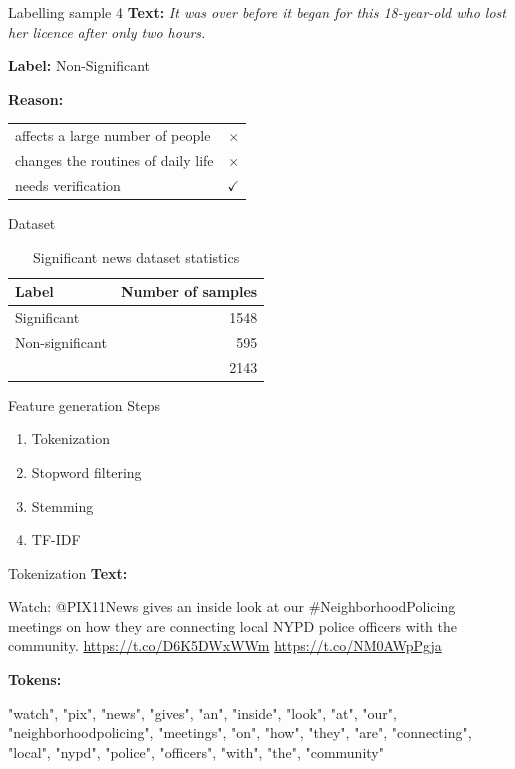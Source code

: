 \documentclass[12pt]{beamer}
\begin{document}
\begin{frame}{Labelling sample 4}
\textbf{Text:}
\textit{It was over before it began for this 18-year-old who lost her licence after only two hours.}\par
\textbf{Label:} Non-Significant\par
\textbf{Reason:}
\begin{table}
    \begin{tabular}{l | r}
        \toprule
        affects a large number of people & $\times$ \\
        changes the routines of daily life & $\times$ \\
        needs verification & $\checkmark$ \\
        \bottomrule
    \end{tabular}
\end{table}
\end{frame}

\begin{frame}{Dataset}
    \begin{table}[h]
    \begin{center}
    \begin{tabular}{lr}
    \toprule 
    Label&Number of samples\\
    \midrule 
    Significant&1548\\
    Non-significant&595\\
    \bottomrule
    &2143 \\
    \end{tabular}
    \caption{Significant news dataset statistics}
    \label{tbl:dataset_statistics}
    \end{center}
    \end{table}
\end{frame}

\begin{frame}{Feature generation}
    Steps
    \begin{enumerate}
        \item Tokenization
        \item Stopword filtering
        \item Stemming
        \item TF-IDF
    \end{enumerate}
\end{frame}

\begin{frame}{Tokenization}
    \textbf{Text:} \par
    Watch: @PIX11News  gives an inside look at our \#NeighborhoodPolicing
    meetings on how they are connecting local NYPD police officers with
    the community. \url{https://t.co/D6K5DWxWWm} \url{https://t.co/NM0AWpPgja}

    \textbf{Tokens:} \par
    "watch", "pix", "news", "gives", "an", "inside", "look", "at", "our", "neighborhoodpolicing", "meetings", "on", "how", "they", "are", "connecting", "local", "nypd", "police", "officers", "with", "the", "community"
\end{frame}
\end{document}

